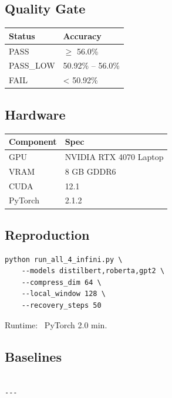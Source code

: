 \subsection{Quality Gate}

\begin{table}[H]
\centering
\small
\begin{tabular}{ll}
\toprule
\textbf{Status} & \textbf{Accuracy} \\
\midrule
PASS & $\ge$ 56.0\% \\
PASS\_LOW & 50.92\% -- 56.0\% \\
FAIL & < 50.92\% \\
\bottomrule
\end{tabular}
\end{table}

\subsection{Hardware}

\begin{table}[H]
\centering
\small
\begin{tabular}{ll}
\toprule
\textbf{Component} & \textbf{Spec} \\
\midrule
GPU & NVIDIA RTX 4070 Laptop \\
VRAM & 8 GB GDDR6 \\
CUDA & 12.1 \\
PyTorch & 2.1.2 \\
\bottomrule
\end{tabular}
\end{table}

\subsection{Reproduction}

\begin{lstlisting}
python run_all_4_infini.py \
    --models distilbert,roberta,gpt2 \
    --compress_dim 64 \
    --local_window 128 \
    --recovery_steps 50
\end{lstlisting}

Runtime: ~PyTorch 2.0 min.

\subsection{Baselines}

\begin{lstlisting}

---
\end{lstlisting}


